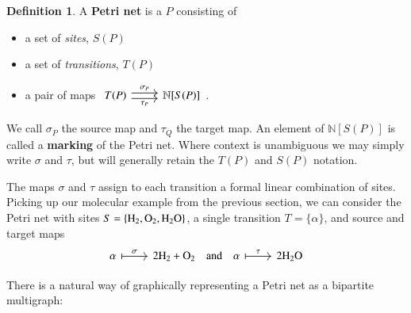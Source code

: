 \documentclass[aps,prd,onecolumn,nofootinbib,letterpaper,preprintnumbers,superscriptaddress,eqsecnum]{revtex4}
\theoremstyle{definition}
\newtheorem{definition}{Definition}
\newcommand{\N}{\mathbb{N}}
\begin{document}
\begin{definition}\label{def:petri}
    A \textbf{Petri net} is a $P$ consisting of
    \begin{itemize}
        \item a set of \textit{sites}, $S(P)$
        \item a set of \textit{transitions}, $T(P)$
        \item a pair of maps $\begin{tikzcd}
                T(P)
                \arrow[r, shift left = 1, "\sigma_P"]
                \arrow[r, shift right = 1, "\tau_P", swap]
                &
                \N[S(P)]
        \end{tikzcd}$.
    \end{itemize}
    We call $\sigma_P$ the source map and $\tau_Q$ the target map.
    An element of $\N[S(P)]$ is called a \textbf{marking} of the Petri net.
    Where context is unambiguous we may simply write $\sigma$ and $\tau$, but will generally retain the $T(P)$ and $S(P)$ notation.
\end{definition}

The maps $\sigma$ and $\tau$ assign to each transition a formal linear combination of sites.
Picking up our molecular example from the previous section, we can consider the Petri net with sites $S = \{\ce{H_2}, \ce{O_2}, \ce{H_2O}\}$, a single transition $T = \{\alpha\}$, and source and target maps
\begin{equation*}
    \begin{tikzcd}
        \alpha \arrow[r, mapsto, "\sigma"] & 2\ce{H_2} + \ce{O_2}
        \quad\textrm{and}\quad
        \alpha \arrow[r, mapsto, "\tau"] & 2\ce{H_2O}
    \end{tikzcd}
\end{equation*}

There is a natural way of graphically representing a Petri net as a bipartite multigraph:

\begin{center}
\end{center}
\end{document}
